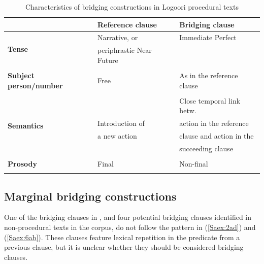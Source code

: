 \documentclass[output=paper]{LSP/langsci}
\begin{document}
\begin{table}[]
\small
\caption{Characteristics of bridging constructions in Logoori procedural texts}
\label{SaTabl1}
\begin{tabular}{lll}
\lsptoprule
                                    & \textbf{Reference clause} & \textbf{Bridging clause}       \\
\midrule
\multirow{2}{*}{\textbf{Tense}}     & Narrative, or             & Immediate Perfect              \\
                                    & periphrastic Near Future  &                                \\    \cline{1-3}
                                     &                      &                       \\ 
\textbf{Subject person/number}      & Free                      & As in the reference clause     \\ \cline{1-3}
                                    &                      &                       \\                 
\multirow{5}{*}{\textbf{Semantics}} &    						  & Close temporal link betw.      \\
                                    & Introduction of                    & action in the reference  \\
                                    & a new action                           & clause and action in the    \\
                                    &                           & succeeding clause                        \\ \cline{1-3}
                                      &                      &                       \\                                   
 \textbf{Prosody}                    & Final                     & Non-final                      \\
\lspbottomrule
\end{tabular}
\end{table}





\subsection{Marginal bridging constructions}
\label{Samarginal}
One of the bridging clauses in \citet{Chesi2014}, and four potential bridging clauses identified in non-procedural texts in the corpus, do not follow the pattern in (\ref{Saex:2ad}) and (\ref{Saex:6ab}). These clauses feature lexical repetition in the predicate from a previous clause, but it is unclear whether they should be considered bridging clauses. 
\end{document}
